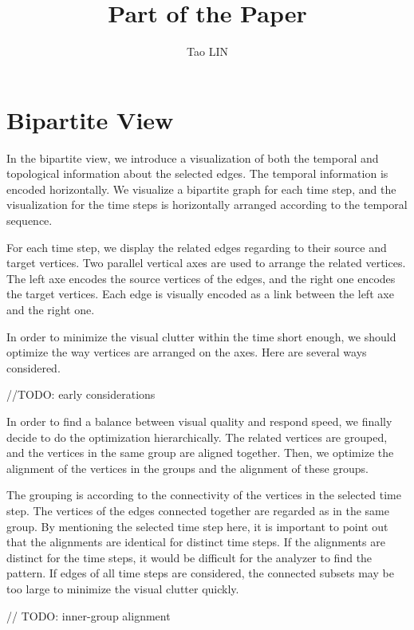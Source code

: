\documentclass{article}
\title{Part of the Paper}
\author{Tao LIN}
\begin{document}
\maketitle

\section{Bipartite View}

In the bipartite view, we introduce a visualization of both the temporal and topological information about the selected edges.
The temporal information is encoded horizontally. We visualize a bipartite graph for each time step, and the visualization for the time steps is horizontally arranged according to the temporal sequence.

For each time step, we display the related edges regarding to their source and target vertices. Two parallel vertical axes are used to arrange the related vertices. The left axe encodes the source vertices of the edges, and the right one encodes the target vertices. Each edge is visually encoded as a link between the left axe and the right one. 

In order to minimize the visual clutter within the time short enough, we should optimize the way vertices are arranged on the axes.
Here are several ways considered.

//TODO: early considerations

In order to find a balance between visual quality and respond speed, we finally decide to do the optimization hierarchically. The related vertices are grouped, and the vertices in the same group are aligned together. Then, we optimize the alignment of the vertices in the groups and the alignment of these groups.

The grouping is according to the connectivity of the vertices in the selected time step. The vertices of the edges connected together are regarded as in the same group. By mentioning the selected time step here, it is important to point out that the alignments are identical for distinct time steps. If the alignments are distinct for the time steps, it would be difficult for the analyzer to find the pattern. If edges of all time steps are considered, the connected subsets may be too large to minimize the visual clutter quickly.

// TODO: inner-group alignment
\end{document}
